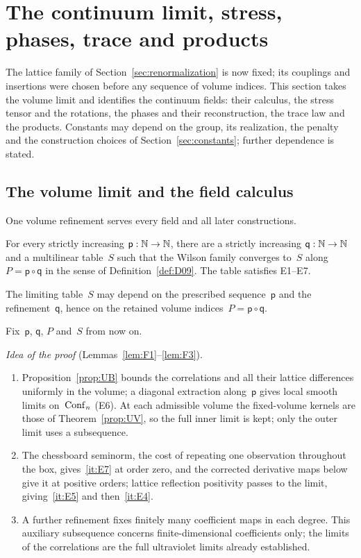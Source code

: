 \section{The continuum limit, stress, phases, trace and products}\label{sec:continuum-results}

The lattice family of Section~\ref{sec:renormalization} is now fixed; its couplings and insertions were chosen before any sequence of volume indices. This section takes the volume limit and identifies the continuum fields: their calculus, the stress tensor and the rotations, the phases and their reconstruction, the trace law and the products. Constants may depend on the group, its realization, the penalty and the construction choices of Section~\ref{sec:constants}; further dependence is stated.

\subsection{The volume limit and the field calculus}\label{sec:volume-limit}

One volume refinement serves every field and all later constructions.
\nopagebreak
\begin{theorem}\label{prop:IV}\label{thm:IV}
For every strictly increasing $\mathsf p:\mathbb{N}\to\mathbb{N}$, there are a strictly increasing $\mathsf q:\mathbb{N}\to\mathbb{N}$ and a multilinear table~$S$ such that the Wilson family converges to~$S$ along $P=\mathsf p\circ\mathsf q$ in the sense of Definition~\ref{def:D09}. The table satisfies E1--E7.
\end{theorem}
\begin{remark}\label{rem:volume-choice}
The limiting table~$S$ may depend on the prescribed sequence~$\mathsf p$ and the refinement~$\mathsf q$, hence on the retained volume indices~$P=\mathsf p\circ\mathsf q$.
\end{remark}
Fix~$\mathsf p$, $\mathsf q$, $P$ and~$S$ from now on.

\emph{Idea of the proof} (Lemmas~\ref{lem:F1}--\ref{lem:F3}).
\begin{enumerate}[label=\textup{Step \arabic*.},leftmargin=4.2em,nosep]
\item Proposition~\ref{prop:UB} bounds the correlations and all their lattice differences uniformly in the volume; a diagonal extraction along~$\mathsf p$ gives local smooth limits on~$\mathrm{Conf}_{n}$ (E6). At each admissible volume the fixed-volume kernels are those of Theorem~\ref{prop:UV}, so the full inner limit is kept; only the outer limit uses a subsequence.
\item The chessboard seminorm, the cost of repeating one observation throughout the box, gives~\ref{it:E7} at order zero, and the corrected derivative maps below give it at positive orders; lattice reflection positivity passes to the limit, giving~\ref{it:E5} and then~\ref{it:E4}.
\item A further refinement fixes finitely many coefficient maps in each degree. This auxiliary subsequence concerns finite-dimensional coefficients only; the limits of the correlations are the full ultraviolet limits already established.
\end{enumerate}

